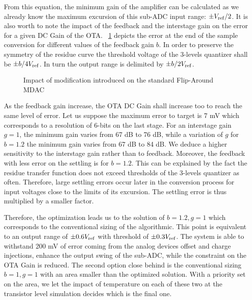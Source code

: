 From this equation, the minimum gain of the amplifier can be calculated as we already know the maximum excursion of this sub-ADC input range: \(\pm V_{\rm ref}/2\). It is also worth to note the impact of the feedback and the interstage gain on the error for a given DC Gain of the OTA\@. \figurename~\ref{fig:algo-cb-impact} depicts the error at the end of the sample conversion for different values of the feedback gain \(b\). In order to preserve the symmetry of the residue curve the threshold voltage of the 3-levels quantizer shall be \(\pm b/4 V_{\rm ref}\). In turn the output range is delimited by \(\pm b/2 V_{\rm ref}\). 

\begin{figure}[htp]
	\centering
	\begin{subfigure}[b]{0.45\textwidth}
		\centering
		\resizebox{\textwidth}{!}{
			
		}
		\label{fig:algo-cb-impact}
	\end{subfigure}
	\begin{subfigure}[b]{0.45\textwidth}
		\centering
		\resizebox{\textwidth}{!}{
			
		}
		\label{fig:algo-cg-impact}
	\end{subfigure}
	\caption{Impact of modification introduced on the standard Flip-Around MDAC}
	\label{fig:algo-error-cb-cg}
\end{figure}

As the feedback gain increase, the OTA DC Gain shall increase too to reach the same level of error. Let us suppose the maximum error to target is 7 mV which corresponds to a resolution of 6-bits on the last stage. For an interstage gain \(g = 1\), the minimum gain varies from 67 dB to 76 dB, while a variation of \(g\) for \(b = 1.2\) the minimum gain varies from 67 dB to 84 dB. We deduce a higher sensitivity to the interstage gain rather than to feedback. Moreover, the feedback with less error on the settling is for \(b = 1.2\). This can be explained by the fact the residue transfer function does not exceed thresholds of the 3-levels quantizer as often. Therefore, large settling errors occur later in the conversion process for input voltages close to the limits of its excursion. The settling error is thus multiplied by a smaller factor.

Therefore, the optimization leads us to the solution of \(b = 1.2, g = 1\) which corresponds to the conventional sizing of the algorithmic. This point is equivalent to an output range of \(\pm 0.6 V_{\rm ref}\) with threshold of \(\pm 0.3 V_{\rm ref}\). The system is able to withstand 200 mV of error coming from the analog devices offset and charge injections, enhance the output swing of the sub-ADC, while the constraint on the OTA Gain is reduced. The second option close behind is the conventional sizing \(b = 1, g = 1\) with an area smaller than the optimized solution. With a priority set on the area, we let the impact of temperature on each of these two at the transistor level simulation decides which is the final one.

